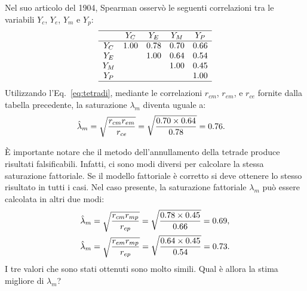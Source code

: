 Nel suo articolo del 1904, Spearman osservò le seguenti correlazioni tra 
le variabili $Y_c$, $Y_e$, $Y_m$ e $Y_p$:
\[
\begin{array}{ccccc}
  \hline
    & Y_C & Y_E & Y_M & Y_P \\
  \hline
  Y_C & 1.00 & 0.78 & 0.70 & 0.66 \\
  Y_E &   & 1.00 & 0.64 & 0.54 \\
  Y_M &   &   & 1.00 & 0.45 \\
  Y_P &   &   &   & 1.00 \\
  \hline
\end{array}
\]
Utilizzando l'Eq.~\eqref{eq:tetradi}, mediante le correlazioni $r_{cm}$, $r_{em}$, e $r_{ce}$ fornite dalla tabella precedente, la saturazione $\lambda_m$ diventa uguale a:
\begin{align}
  \hat{\lambda}_m &= \sqrt{ \frac{r_{cm} r_{em}}{r_{ce}} } = \sqrt{
    \frac{0.70 \times 0.64}{0.78} } = 0.76. \notag
\end{align}

È importante notare che il metodo dell'annullamento della tetrade produce risultati falsificabili. 
Infatti, ci sono modi diversi per calcolare la stessa saturazione fattoriale. 
Se il modello fattoriale è corretto si deve ottenere lo stesso risultato in tutti i casi.  
Nel caso presente, la saturazione fattoriale $\lambda_m$ può essere calcolata in altri due modi:
\begin{align}
  \hat{\lambda}_m &= \sqrt{ \frac{r_{cm} r_{mp}}{r_{cp}} } = \sqrt{ \frac{0.78 \times 0.45}{0.66} } = 0.69, \notag \\
  \hat{\lambda}_m &= \sqrt{ \frac{r_{em} r_{mp}}{r_{ep}} } = \sqrt{
    \frac{0.64 \times 0.45}{0.54} } = 0.73. \notag
\end{align}
I tre valori che sono stati ottenuti sono molto simili. 
Qual è allora la stima migliore di  $\lambda_m$? 

